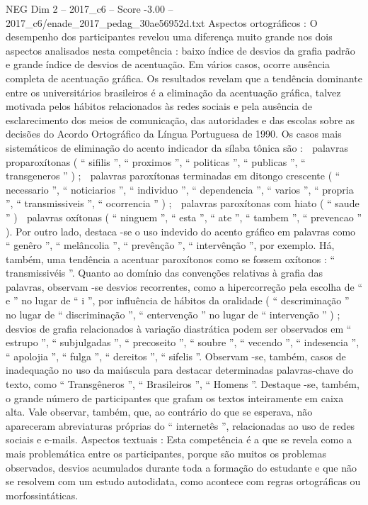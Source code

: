 \begin{textsample}{NEG Dim 2 – 2017\_c6 – Score -3.00 – 2017\_c6/enade\_2017\_pedag\_30ae56952d.txt}
Aspectos ortográficos : O desempenho dos participantes revelou uma diferença muito grande nos dois aspectos analisados nesta competência : baixo índice de desvios da grafia padrão e grande índice de desvios de acentuação.
Em vários casos, ocorre ausência completa de acentuação gráfica.
Os resultados revelam que a tendência dominante entre os universitários brasileiros é a eliminação da acentuação gráfica, talvez motivada pelos hábitos relacionados às redes sociais e pela ausência de esclarecimento dos meios de comunicação, das autoridades e das escolas sobre as decisões do Acordo Ortográfico da Língua Portuguesa de 1990.
Os casos mais sistemáticos de eliminação do acento indicador da sílaba tônica são :  palavras proparoxítonas ( “ sifilis ”, “ proximos ”, “ politicas ”, “ publicas ”, “ transgeneros ” ) ;  palavras paroxítonas terminadas em ditongo crescente ( “ necessario ”, “ noticiarios ”, “ individuo ”, “ dependencia ”, “ varios ”, “ propria ”, “ transmissiveis ”, “ ocorrencia ” ) ;  palavras paroxítonas com hiato ( “ saude ” )  palavras oxítonas ( “ ninguem ”, “ esta ”, “ ate ”, “ tambem ”, “ prevencao ” ).
Por outro lado, destaca -se o uso indevido do acento gráfico em palavras como “ genêro ”, “ melâncolia ”, “ prevênção ”, “ intervênção ”, por exemplo.
Há, também, uma tendência a acentuar paroxítonos como se fossem oxítonos : “ transmissivéis ”.
Quanto ao domínio das convenções relativas à grafia das palavras, observam -se desvios recorrentes, como a hipercorreção pela escolha de “ e ” no lugar de “ i ”, por influência de hábitos da oralidade ( “ descriminação ” no lugar de “ discriminação ”, “ entervenção ” no lugar de “ intervenção ” ) ; desvios de grafia relacionados à variação diastrática podem ser observados em “ estrupo ”, “ subjulgadas ”, “ precoseito ”, “ soubre ”, “ vecendo ”, “ indesencia ”, “ apolojia ”, “ fulga ”, “ dereitos ”, “ sifelis ”.
Observam -se, também, casos de inadequação no uso da maiúscula para destacar determinadas palavras-chave do texto, como “ Transgêneros ”, “ Brasileiros ”, “ Homens ”.
Destaque -se, também, o grande número de participantes que grafam os textos inteiramente em caixa alta.
Vale observar, também, que, ao contrário do que se esperava, não apareceram abreviaturas próprias do “ internetês ”, relacionadas ao uso de redes sociais e e-mails.
Aspectos textuais : Esta competência é a que se revela como a mais problemática entre os participantes, porque são muitos os problemas observados, desvios acumulados durante toda a formação do estudante e que não se resolvem com um estudo autodidata, como acontece com regras ortográficas ou morfossintáticas.

\end{textsample}
